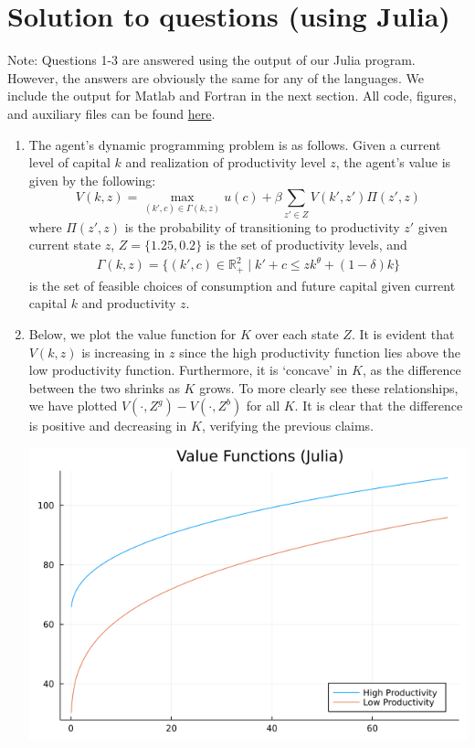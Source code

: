 \documentclass[12pt]{article}
\begin{document}
\section{Solution to questions (using Julia)}
Note: Questions 1-3 are answered using the output of our Julia program. However, the answers are obviously the same for any of the languages. We include the output for Matlab and Fortran in the next section. All code, figures, and auxiliary files can be found \href{https://github.com/caitlin-dutta/Computational-899/tree/main/PS1}{here}. 
\begin{enumerate}
	\item The agent's dynamic programming problem is as follows. Given a current level of capital $k$ and realization of productivity level $z$, the agent's value is given by the following:
	\[V(k, z) = \max_{(k', c) \in \Gamma(k,z)} u(c) + \beta \sum_{z' \in Z} V(k', z') \Pi(z', z)\]
	where $\Pi(z',z)$ is the probability of transitioning to productivity $z'$ given current state $z$, $Z = \{1.25, 0.2\}$ is the set of productivity levels, and
	\begin{align*}\Gamma(k,z) = \{(k', c) \in \mathbb{R}^2_+ \mid k' + c \leq z k^{\theta} + (1-\delta) k\}
	\end{align*}
	is the set of feasible choices of consumption and future capital given current capital $k$ and productivity $z$.
    \item Below, we plot the value function for $K$ over each state $Z$. It is evident that $V(k, z)$ is increasing in $z$ since the high productivity function lies above the low productivity function. Furthermore, it is `concave' in $K$, as the difference between the two shrinks as $K$ grows. To more clearly see these relationships, we have plotted $V(\cdot, Z^g) - V(\cdot, Z^b)$ for all $K$. It is clear that the difference is positive and decreasing in $K$, verifying the previous claims.
    \begin{center}
        \includegraphics[scale=0.4]{vfplot.png}\\

\end{center}
\end{enumerate}
\end{document}
